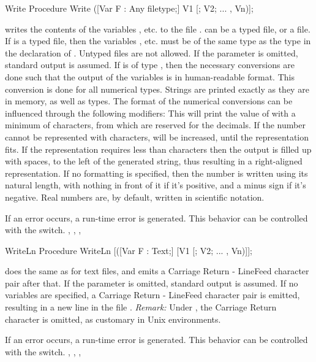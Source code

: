 \documentclass{report}
\begin{document}
\begin{procedure}{Write}
\Declaration
Procedure Write ([Var F : Any filetype;] V1 [; V2; ... , Vn)];

\Description
{} writes the contents of the variables ,  etc. to
the file .  can be a typed file, or a  file.
If  is a typed file, then the variables ,  etc. must
be of the same type as the type in the declaration of . Untyped files
are not allowed.
If the parameter  is omitted, standard output is assumed.
If  is of type , then the necessary conversions are done
such that the output of the variables is in human-readable format.
This conversion is done for all numerical types. Strings are printed exactly
as they are in memory, as well as  types.
The format of the numerical conversions can be influenced through
the following modifiers:
This will print the value of  with a minimum of
 characters, from which  are reserved for the
decimals. If the number cannot be represented with  characters,
 will be increased, until the representation fits. If the
representation requires less than  characters then the output
is filled up with spaces, to the left of the generated string, thus
resulting in a right-aligned representation.
If no formatting is specified, then the number is written using its natural
length, with nothing in front of it if it's positive, and a minus sign if
it's negative.
Real numbers are, by default, written in scientific notation.

\Errors
If an error occurs, a run-time error is generated. This behavior can be
controlled with the  switch.
\SeeAlso
{}, , , 
\end{procedure}
\begin{procedure}{WriteLn}
\Declaration
Procedure WriteLn [([Var F : Text;] [V1 [; V2; ... , Vn)]];

\Description
{} does the same as  for text files, and emits a
Carriage Return - LineFeed character pair after that.
If the parameter  is omitted, standard output is assumed.
If no variables are specified, a Carriage Return - LineFeed character pair
is emitted, resulting in a new line in the file .
{\em Remark:} Under \linux, the Carriage Return character is omitted, as
customary in Unix environments.

\Errors
If an error occurs, a run-time error is generated. This behavior can be
controlled with the  switch.
\SeeAlso
{}, , , 
\end{procedure}


%
%
\printindex
\end{document}
